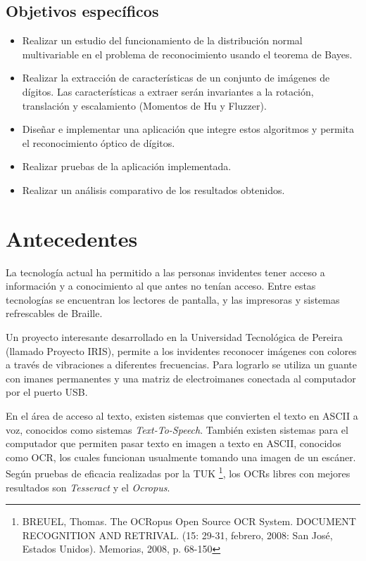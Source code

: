 \documentclass[a4paper, 11pt, oneside]{report}
\begin{document}
	\subsection{Objetivos específicos}
	\begin{itemize}
	\item Realizar un estudio del funcionamiento de la distribución normal multivariable en el problema de reconocimiento usando el teorema de Bayes.
	\item Realizar la extracción de características de un conjunto de imágenes de dígitos. Las características a extraer serán invariantes a la rotación, translación y escalamiento (Momentos de Hu y Fluzzer).
	\item Diseñar e implementar una aplicación que integre estos algoritmos y permita el reconocimiento óptico de dígitos.
	\item Realizar pruebas de la aplicación implementada.
	\item Realizar un análisis comparativo de los resultados obtenidos.
	\end{itemize}
	
\section {Antecedentes}

La tecnología actual ha permitido a las personas invidentes tener acceso a información y a conocimiento al que antes no tenían acceso. Entre estas tecnologías se encuentran los lectores de pantalla, y las impresoras y sistemas refrescables de Braille.
	
Un proyecto interesante desarrollado en la Universidad Tecnológica de Pereira (llamado Proyecto IRIS), permite a los invidentes reconocer imágenes con colores a través de vibraciones a diferentes frecuencias. Para lograrlo se utiliza un guante con imanes permanentes y una matriz de electroimanes conectada al computador por el puerto USB.

En el área de acceso al texto, existen sistemas que convierten el texto en ASCII a voz, conocidos como sistemas \textit{Text-To-Speech}. También existen sistemas para el computador que permiten pasar texto en imagen a texto en ASCII, conocidos como OCR, los cuales funcionan usualmente tomando una imagen de un escáner. Según pruebas de eficacia realizadas por la TUK \footnote{BREUEL, Thomas. The OCRopus Open Source OCR System. DOCUMENT RECOGNITION AND RETRIVAL. (15: 29-31, febrero, 2008: San José, Estados Unidos). Memorias, 2008, p. 68-150}, los OCRs libres con mejores resultados son \textit{Tesseract} y el  \textit{Ocropus}. 
\end{document}
